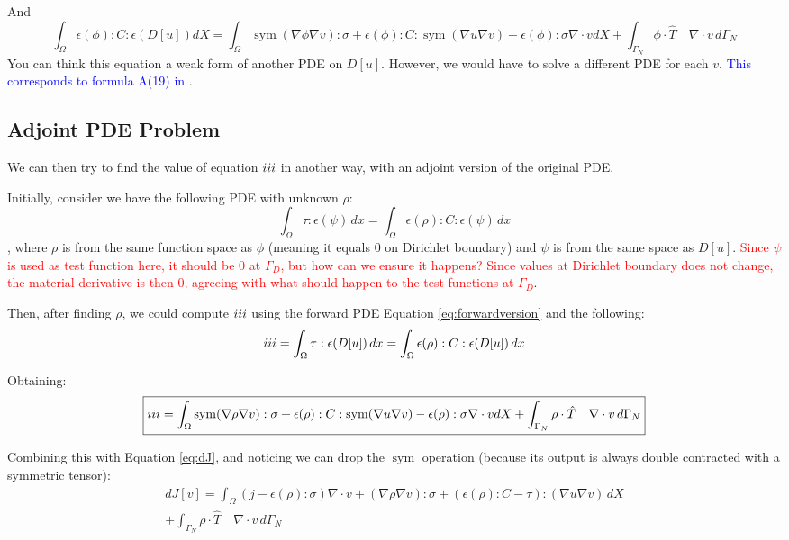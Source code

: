 \documentclass[11pt]{article}
\DeclareMathOperator{\sym}{sym}
\newcommand{\RNum}[1]{\uppercase\expandafter{\romannumeral #1\relax}}
\newcommand{\blue}{\textcolor{blue}}
\begin{document}
And
{\small
\begin{equation}
  \boxed{\int_{\Omega} \epsilon(\phi):C:\epsilon(D[u]) dX =
  \int_{\Omega} \sym(\nabla \phi \nabla v):\sigma + \epsilon(\phi):C:\sym(\nabla u \nabla v) - \epsilon(\phi): \sigma \nabla \cdot v  dX + \int_{\Gamma_{N}} \phi \cdot \hat T \quad \nabla \cdot v\, d\Gamma_{N}}
  \label{eq:forwardversion}
\end{equation}
}
You can think this equation a weak form of another PDE on $D[u]$. However, we would have to solve a different PDE for each $v$. \blue{This corresponds to formula A(19) in \cite{panetta2017}}.

\subsection{Adjoint PDE Problem}
We can then try to find the value of equation $\RNum{3}$ in another way, with an adjoint version of the original PDE.

Initially, consider we have the following PDE with unknown $\rho$:
\begin{equation}
  \int_\Omega \tau:\epsilon(\psi)\, dx = \int_\Omega \epsilon(\rho):C:\epsilon(\psi) \, dx 
  \label{eq:adjointproblem}
\end{equation}
, where $\rho$ is from the same function space as $\phi$ (meaning it equals $0$ on Dirichlet boundary) and $\psi$ is from the same space as $D[u]$. \textcolor{red}{Since $\psi$ is used as test function here, it should be $0$ at $\Gamma_D$, but how can we ensure it happens? Since values at Dirichlet boundary does not change, the material derivative is then $0$, agreeing with what should happen to the test functions at $\Gamma_D$}.

Then, after finding $\rho$, we could compute $\RNum{3}$ using the forward PDE Equation \ref{eq:forwardversion} and the following:
\begin{align*}
  \RNum{3} = \int_\Omega \tau:\epsilon(D[u])\, dx = \int_\Omega \epsilon(\rho):C:\epsilon(D[u]) \, dx
\end{align*}

Obtaining:
\begin{equation}
  \boxed{\RNum{3} =
  \int_{\Omega} \sym(\nabla \rho \nabla v):\sigma + \epsilon(\rho):C:\sym(\nabla u \nabla v) - \epsilon(\rho): \sigma \nabla \cdot v  dX + \int_{\Gamma_{N}} \rho \cdot \hat T \quad \nabla \cdot v\, d\Gamma_{N}}
  \label{eq:IIIcomputation}
\end{equation}

Combining this with Equation \ref{eq:dJ}, and noticing we can drop the $\sym$ operation (because its output is always double contracted with a symmetric tensor):
\begin{multline}
  \boxed{dJ[v] = \int_{\Omega} (j - \epsilon(\rho): \sigma)\nabla \cdot v + (\nabla \rho \nabla v):\sigma + (\epsilon(\rho):C - \tau) : (\nabla u \nabla v) \, dX } \\ \boxed{+ \int_{\Gamma_{N}} \rho \cdot \hat T \quad \nabla \cdot v\, d\Gamma_{N}  }
  \label{eq:completedJ}
\end{multline}
\end{document}
